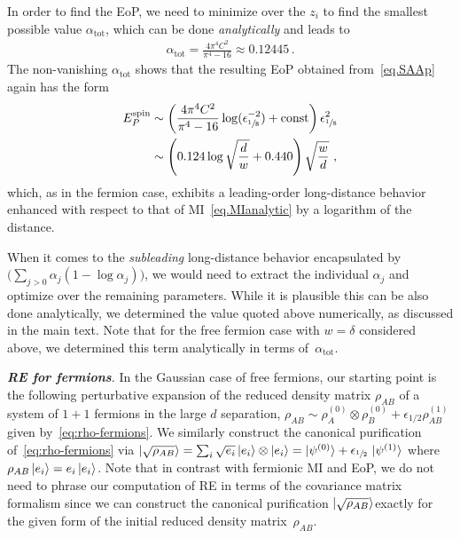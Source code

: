 \documentclass[prl,a4paper,notitlepage,twocolumn,superscriptaddress,longbibliography,reprint]{revtex4-2}
\newcommand{\mysection}[1]{{\vspace{10 pt}\noindent \emph{{\textbf{#1}}.}}}
\begin{document}
In order to find the EoP, we need to minimize over the $z_i$ to find the smallest possible value $\alpha_{\mathrm{tot}}$, which can be done \emph{analytically} and leads to
\begin{align}
\label{eq.alphatot}
    \alpha_{\mathrm{tot}}=\frac{4\pi^4C^2}{\pi^4-16}\approx 0.12445\,.
\end{align}
The non-vanishing $\alpha_{\mathrm{tot}}$ shows that the resulting EoP obtained from~\eqref{eq.SAAp} again has the form 
\begin{align}
\label{EQ_EOP_SPIN_W1}
    E_P^\text{spin} &\sim \left(  \frac{4\pi^4C^2}{\pi^4-16} \log(\epsilon_{\sfrac{1}{8}}^{-2}) + \mathrm{const} \right) \epsilon_{\sfrac{1}{8}}^{2} \nonumber\\
    &\sim \left( 0.124 \log\sqrt{\frac{d}{w}} + 0.440 \right) \sqrt{\frac{w}{d}} \ ,
\end{align}
which, as in the fermion case, exhibits a leading-order long-distance behavior enhanced with respect to that of MI~\eqref{eq.MIanalytic} by a logarithm of the distance.

When it comes to the \emph{subleading} long-distance behavior encapsulated by~$\Big( \sum_{j>0}\alpha_j(1-\log{\alpha_j}) \Big)$, we would need to extract the individual $\alpha_j$ and optimize over the remaining parameters. While it is plausible this can be also done analytically, we determined the value quoted above numerically, as discussed in the main text. Note that for the free fermion case with $w=\delta$ considered above, we determined this term analytically in terms of~$\alpha_{\mathrm{tot}}$.

\mysection{RE for fermions} In the Gaussian case of free fermions, our starting point is the following perturbative expansion of the reduced density matrix $\rho_{AB}$ of a system of $1+1$ fermions in the large $d$ separation, $\rho_{AB}\sim\rho^{(0)}_{A}\otimes\rho^{(0)}_{B}+\epsilon_{1/2}\rho^{(1)}_{AB}$ given by~\eqref{eq:rho-fermions}. We similarly construct the canonical purification of~\eqref{eq:rho-fermions} via $\ket{\sqrt{\rho_{AB}}}=\sum_{i}\sqrt{e_{i}}\ket{e_{i}}\otimes\ket{e_{i}}=\ket{\psi^{(0)}}+\epsilon_{\sfrac{1}{2}}\, \ket{\psi^{(1)}}$ where $\rho_{AB}\ket{e_{i}}=e_{i}\ket{e_{i}}$. Note that in contrast with fermionic MI and EoP, we do not need to phrase our computation of RE in terms of the covariance matrix formalism since we can construct the canonical purification $\ket{\sqrt{\rho_{AB}}}$exactly for the given form of the initial reduced density matrix~$\rho_{AB}$. 
\end{document}
